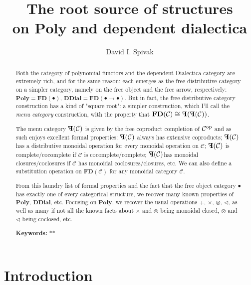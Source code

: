 \documentclass[11pt, one side, article]{memoir}
\theoremstyle{definition}
\theoremstyle{plain}
\newcommand{\cat}[1]{\mathcal{#1}}%
\newcommand{\Cat}[1]{\mathbf{#1}}%
\newcommand{\op}{^\tn{op}}
\newcommand{\tn}[1]{\textnormal{#1}}
\newcommand{\poly}{\Cat{Poly}}
\newcommand{\0}{\Cat{0}}
\newcommand{\1}{\Cat{1}}
\newcommand{\tri}{\mathbin{\triangleleft}}
\newcommand{\fd}{\Cat{FD}}
\newcommand{\mn}{\reflectbox{$\Cat{F}$}}
\newcommand{\ddial}{\Cat{DDial}}
\begin{document}
\title{The root source of structures\\on $\poly$ and dependent dialectica
}

\author{David I. Spivak}

\date{\vspace{-.2in}}

\maketitle

\begin{abstract}
Both the category of polynomial functors and the dependent Dialectica category are extremely rich, and for the same reason: each emerges as the free distributive category on a simpler category, namely on the free object and the free arrow, respectively: $\poly=\fd(\bullet)$, $\ddial=\fd(\bullet\to\bullet)$. But in fact, the free distributive category construction has a kind of "square root": a simpler construction, which I'll call the \emph{menu category} construction, with the property that $\fd(\cat{C})\cong\mn(\mn(\cat{C}))$.

The menu category $\mn(\cat{C})$ is given by the free coproduct completion of $\cat{C}\op$ and as such enjoys excellent formal properties: $\mn(\cat{C})$ always has extensive coproducts; $\mn(\cat{C})$ has a distributive monoidal operation for every monoidal operation on $\cat{C}$; $\mn(\cat{C})$ is complete/cocomplete if $\cat{C}$ is cocomplete/complete; $\mn(\cat{C})$has monoidal closures/coclosures if $\cat{C}$ has monoidal coclosures/closures, etc. We can also define a substitution operation on $\fd(\cat{C})$ for any monoidal category $\cat{C}$. 

From this laundry list of formal properties and the fact that the free object category $\bullet$ has exactly one of every categorical structure, we recover many known properties of $\poly$, $\Cat{DDial}$, etc. Focusing on $\poly$, we recover the usual operations $+$, $\times$, $\otimes$, $\tri$, as well as many if not all the known facts about $\times$ and $\otimes$ being monoidal closed, $\otimes$ and $\tri$ being coclosed, etc.  \\

\smallskip

\noindent
\textbf{Keywords:} **
\end{abstract}

\chapter{Introduction}
\end{document}

